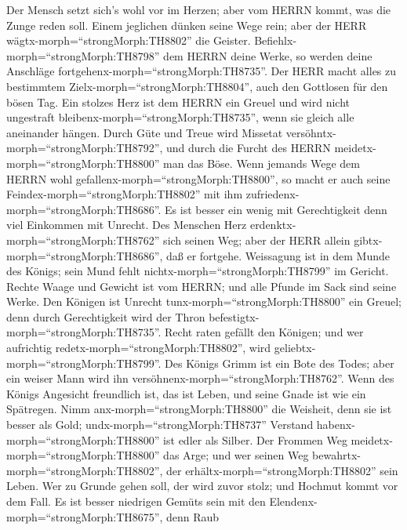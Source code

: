  Der Mensch setzt sich's wohl vor im Herzen; aber vom HERRN
kommt, was die Zunge reden soll.  Einem jeglichen dünken
seine Wege rein; aber der HERR wägtx-morph=``strongMorph:TH8802'' die
Geister.  Befiehlx-morph=``strongMorph:TH8798'' dem HERRN
deine Werke, so werden deine Anschläge
fortgehenx-morph=``strongMorph:TH8735''.  Der HERR macht
alles zu bestimmtem Zielx-morph=``strongMorph:TH8804'', auch den
Gottlosen für den bösen Tag.  Ein stolzes Herz ist dem HERRN
ein Greuel und wird nicht ungestraft
bleibenx-morph=``strongMorph:TH8735'', wenn sie gleich alle aneinander
hängen.  Durch Güte und Treue wird Missetat
versöhntx-morph=``strongMorph:TH8792'', und durch die Furcht des HERRN
meidetx-morph=``strongMorph:TH8800'' man das Böse.  Wenn
jemands Wege dem HERRN wohl gefallenx-morph=``strongMorph:TH8800'', so
macht er auch seine Feindex-morph=``strongMorph:TH8802'' mit ihm
zufriedenx-morph=``strongMorph:TH8686''.  Es ist besser ein
wenig mit Gerechtigkeit denn viel Einkommen mit Unrecht. 
Des Menschen Herz erdenktx-morph=``strongMorph:TH8762'' sich seinen Weg;
aber der HERR allein gibtx-morph=``strongMorph:TH8686'', daß er
fortgehe.  Weissagung ist in dem Munde des Königs; sein
Mund fehlt nichtx-morph=``strongMorph:TH8799'' im Gericht. 
Rechte Waage und Gewicht ist vom HERRN; und alle Pfunde im Sack sind
seine Werke.  Den Königen ist Unrecht
tunx-morph=``strongMorph:TH8800'' ein Greuel; denn durch Gerechtigkeit
wird der Thron befestigtx-morph=``strongMorph:TH8735''. 
Recht raten gefällt den Königen; und wer aufrichtig
redetx-morph=``strongMorph:TH8802'', wird
geliebtx-morph=``strongMorph:TH8799''.  Des Königs Grimm
ist ein Bote des Todes; aber ein weiser Mann wird ihn
versöhnenx-morph=``strongMorph:TH8762''.  Wenn des Königs
Angesicht freundlich ist, das ist Leben, und seine Gnade ist wie ein
Spätregen.  Nimm anx-morph=``strongMorph:TH8800'' die
Weisheit, denn sie ist besser als Gold;
undx-morph=``strongMorph:TH8737'' Verstand
habenx-morph=``strongMorph:TH8800'' ist edler als Silber. 
Der Frommen Weg meidetx-morph=``strongMorph:TH8800'' das Arge; und wer
seinen Weg bewahrtx-morph=``strongMorph:TH8802'', der
erhältx-morph=``strongMorph:TH8802'' sein Leben.  Wer zu
Grunde gehen soll, der wird zuvor stolz; und Hochmut kommt vor dem Fall.
 Es ist besser niedrigen Gemüts sein mit den
Elendenx-morph=``strongMorph:TH8675'', denn Raub
